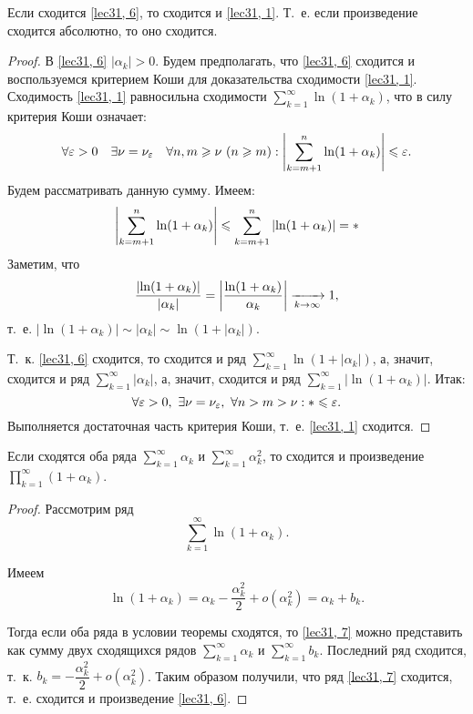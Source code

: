 \documentclass[../../main.tex]{subfiles}
\begin{document}
	\begin{thm}
		Если сходится \eqref{lec31, 6}, то сходится и \eqref{lec31, 1}. Т.~е. если 
		произведение сходится абсолютно, то оно сходится.
		\begin{proof}
			В \eqref{lec31, 6} $|\alpha_k| > 0$. Будем предполагать, что 
			\eqref{lec31, 6} сходится и воспользуемся критерием Коши для доказательства 
			сходимости \eqref{lec31, 1}. Сходимость \eqref{lec31, 1} равносильна 
			сходимости $\sum\limits_{k = 1}^{\infty} \ln (1 + \alpha_k)$, что в силу критерия Коши означает:
			\[\forall \varepsilon > 0\quad \exists \nu = \nu_\varepsilon\quad \forall n, m 
			\geqslant \nu\ (n \geqslant m): \left|{\sum\limits_{k = m + 1}^{n} \ln(1 + 
			\alpha_k)}\right| \leqslant \varepsilon.\]
			Будем рассматривать данную сумму. Имеем:
			\[\left|{\sum\limits_{k = m + 1}^{n} \ln(1 + \alpha_k)}\right| \leqslant 
			\sum\limits_{k = m + 1}^{n} \left|{\ln(1 + \alpha_k)}\right| = *\]
			Заметим, что
			\[\frac{\left|{\ln(1 + \alpha_k)}\right|}{|\alpha_k|} = 
			\left|{ \frac{\ln(1 + \alpha_k)}{\alpha_k}}\right| \xrightarrow[k\to\infty]{} 1,\] т.~е. $| 
			\ln(1 + \alpha_k) | \sim |\alpha_k| \sim \ln(1 + |\alpha_k|)$.
			
			Т.~к. \eqref{lec31, 6} сходится, то сходится и ряд $\sum\limits_{k = 
			1}^{\infty} \ln(1 + |\alpha_k|)$, а, значит, сходится и ряд 
			$\sum\limits_{k = 1}^{\infty} |\alpha_k|$, а, значит,
			сходится и ряд $\sum\limits_{k = 1}^{\infty} |\ln(1 + \alpha_k)|$. Итак:
			\[\forall \varepsilon > 0,\ \exists \nu = \nu_\varepsilon,\ \forall n > m > 
			\nu: * \leqslant \varepsilon.\]
			Выполняется достаточная часть критерия 
			Коши, т.~е. \eqref{lec31, 1} сходится.
		\end{proof}
	\end{thm}

	\begin{thm}
		Если сходятся оба ряда $\sum\limits_{k = 1}^{\infty} \alpha_k$ и 
		$\sum\limits_{k = 1}^{\infty} \alpha_k^2$, то сходится и произведение ${\prod\limits_{k = 
		1}^{\infty} (1 + \alpha_k)}$.
		
		\begin{proof}
			Рассмотрим ряд
			\begin{equation}\label{lec31, 7}
				\sum\limits_{k = 1}^{\infty} \ln(1 + \alpha_k).
			\end{equation}
			
			Имеем \[\ln(1 + \alpha_k) = \alpha_k - \frac{\alpha_k^2}{2} + o(\alpha_k^2) 
			= \alpha_k + b_k.\]
			
			Тогда если оба ряда в условии теоремы сходятся, то \eqref{lec31, 7} 
			можно представить как сумму двух сходящихся рядов $\sum\limits_{k = 1}^{\infty} 
			\alpha_k$ и $\sum\limits_{k = 1}^{\infty} b_k$. Последний ряд сходится, т.~к. $b_k = -\dfrac{\alpha_k^2}2 + o(\alpha_k^2)$. Таким образом получили, что ряд \eqref{lec31, 7} сходится, т.~е. сходится и произведение \eqref{lec31, 6}.
		\end{proof}
	\end{thm}
\end{document}
